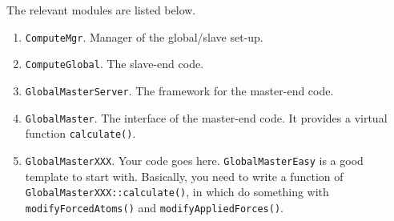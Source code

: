 \documentclass{article}
\begin{document}
The relevant modules are listed below.
\begin{enumerate}
  \item \texttt{ComputeMgr}. Manager of the global/slave set-up.

  \item \texttt{ComputeGlobal}.  The slave-end code.

  \item \texttt{GlobalMasterServer}. The framework for the master-end code.

  \item \texttt{GlobalMaster}.  The interface of the master-end code.
    It provides a virtual function \texttt{calculate()}.

  \item \texttt{GlobalMasterXXX}. Your code goes here.
    \texttt{GlobalMasterEasy} is a good template to start with.
    Basically, you need to write a function of
    \texttt{GlobalMasterXXX::calculate()},
    in which do something with
    \texttt{modifyForcedAtoms()}
    and \texttt{modifyAppliedForces()}.
\end{enumerate}
\end{document}
